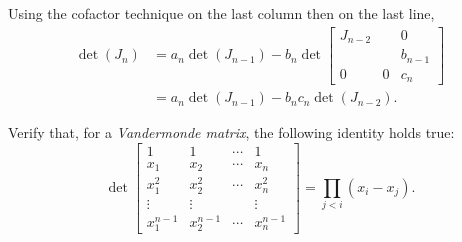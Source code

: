 \begin{solution}
  Using the cofactor technique on the last column then on the last line,
  \begin{align*}
    \det(J_n)
    & = a_n\det(J_{n-1}) - b_n
    \det
    \begin{bmatrix}
     J_{n-2}  &   & 0 \\
              &   & b_{n-1} \\
     0        & 0 & c_n
    \end{bmatrix}\\
    & = a_n\det(J_{n-1}) - b_n c_n \det(J_{n-2}).
  \end{align*}
\end{solution}

Verify that, for a \emph{Vandermonde matrix}, the following identity holds true:
\[
\det
\begin{bmatrix}
	1 & 1 & \cdots & 1\\
	x_1 & x_2 & \cdots & x_n\\
	x_1^2 & x_2^2 & \cdots & x_n^2\\
	\vdots & \vdots &  & \vdots\\
	x_1^{n-1} & x_2^{n-1} & \cdots & x_n^{n-1}
\end{bmatrix} = \prod_{j < i} (x_i - x_j).
\]

